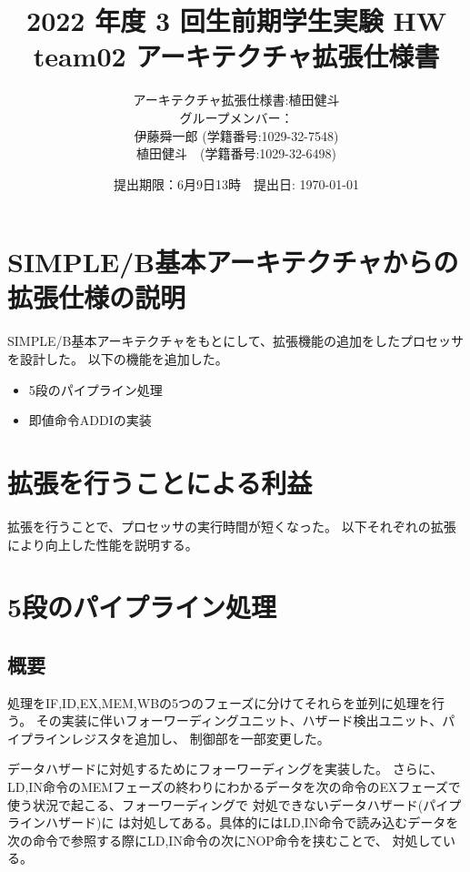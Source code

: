 \documentclass[a4j,titlepage]{jarticle}
\begin{document}
\title{2022 年度 3 回生前期学生実験 HW  \\ \bf team02 アーキテクチャ拡張仕様書}
\author{アーキテクチャ拡張仕様書:植田健斗\\
グループメンバー：\\伊藤舜一郎 (学籍番号:1029-32-7548)
\\植田健斗　(学籍番号:1029-32-6498)}
\date{提出期限：6月9日13時　提出日: \today} %
\maketitle
\newpage

\section{SIMPLE/B基本アーキテクチャからの拡張仕様の説明}
SIMPLE/B基本アーキテクチャをもとにして、拡張機能の追加をしたプロセッサを設計した。
以下の機能を追加した。
\begin{itemize}
\item 5段のパイプライン処理
\item 即値命令ADDIの実装
\end{itemize}

\section{拡張を行うことによる利益}

拡張を行うことで、プロセッサの実行時間が短くなった。
以下それぞれの拡張により向上した性能を説明する。

\section{5段のパイプライン処理}
\subsection{概要}
処理をIF,ID,EX,MEM,WBの5つのフェーズに分けてそれらを並列に処理を行う。
その実装に伴いフォーワーディングユニット、ハザード検出ユニット、パイプラインレジスタを追加し、
制御部を一部変更した。

データハザードに対処するためにフォーワーディングを実装した。
さらに、LD,IN命令のMEMフェーズの終わりにわかるデータを次の命令のEXフェーズで使う状況で起こる、フォーワーディングで
対処できないデータハザード(パイプラインハザード)に
は対処してある。具体的にはLD,IN命令で読み込むデータを次の命令で参照する際にLD,IN命令の次にNOP命令を挟むことで、
対処している。
\end{document}
